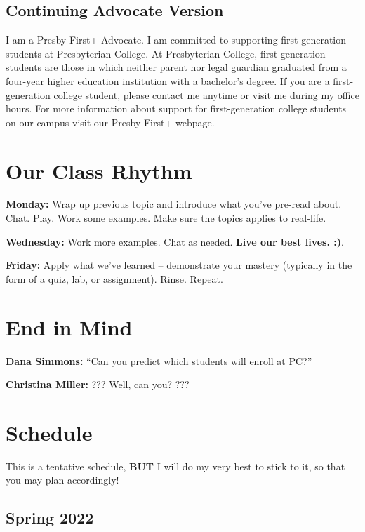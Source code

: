 \documentclass[
]{book}
\begin{document}
\hypertarget{continuing-advocate-version}{%
\section{Continuing Advocate Version}\label{continuing-advocate-version}}

I am a Presby First+ Advocate. I am committed to supporting first-generation students at Presbyterian College. At Presbyterian College, first-generation students are those in which neither parent nor legal guardian graduated from a four-year higher education institution with a bachelor's degree. If you are a first-generation college student, please contact me anytime or visit me during my office hours. For more information about support for first-generation college students on our campus visit our Presby First+ webpage.

\hypertarget{our-class-rhythm}{%
\chapter{Our Class Rhythm}\label{our-class-rhythm}}

\textbf{Monday:} Wrap up previous topic and introduce what you've pre-read about. Chat. Play. Work some examples. Make sure the topics applies to real-life.

\textbf{Wednesday:} Work more examples. Chat as needed. \textbf{Live our best lives. :)}.

\textbf{Friday:} Apply what we've learned -- demonstrate your mastery (typically in the form of a quiz, lab, or assignment). Rinse. Repeat.

\hypertarget{end-in-mind}{%
\chapter{End in Mind}\label{end-in-mind}}

\textbf{Dana Simmons:} ``Can you predict which students will enroll at PC?''

\textbf{Christina Miller:} ??? Well, can you? ???

\hypertarget{schedule}{%
\chapter{Schedule}\label{schedule}}

This is a tentative schedule, \textbf{BUT} I will do my very best to stick to it, so that you may plan accordingly!

\hypertarget{spring-2022}{%
\section*{Spring 2022}\label{spring-2022}}
\end{document}
